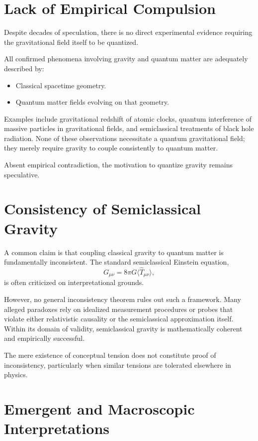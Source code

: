 \documentclass[12pt]{article}
\begin{document}
\section{Lack of Empirical Compulsion}

Despite decades of speculation, there is no direct experimental evidence
requiring the gravitational field itself to be quantized.

All confirmed phenomena involving gravity and quantum matter are adequately
described by:
\begin{itemize}
    \item Classical spacetime geometry.
    \item Quantum matter fields evolving on that geometry.
\end{itemize}

Examples include gravitational redshift of atomic clocks, quantum interference
of massive particles in gravitational fields, and semiclassical treatments of
black hole radiation. None of these observations necessitate a quantum
gravitational field; they merely require gravity to couple consistently to
quantum matter.

Absent empirical contradiction, the motivation to quantize gravity remains
speculative.

\section{Consistency of Semiclassical Gravity}

A common claim is that coupling classical gravity to quantum matter is
fundamentally inconsistent. The standard semiclassical Einstein equation,
\begin{equation}
    G_{\mu\nu} = 8\pi G \langle \hat{T}_{\mu\nu} \rangle,
\end{equation}
is often criticized on interpretational grounds.

However, no general inconsistency theorem rules out such a framework. Many
alleged paradoxes rely on idealized measurement procedures or probes that
violate either relativistic causality or the semiclassical approximation
itself. Within its domain of validity, semiclassical gravity is mathematically
coherent and empirically successful.

The mere existence of conceptual tension does not constitute proof of
inconsistency, particularly when similar tensions are tolerated elsewhere in
physics.

\section{Emergent and Macroscopic Interpretations}
\end{document}
